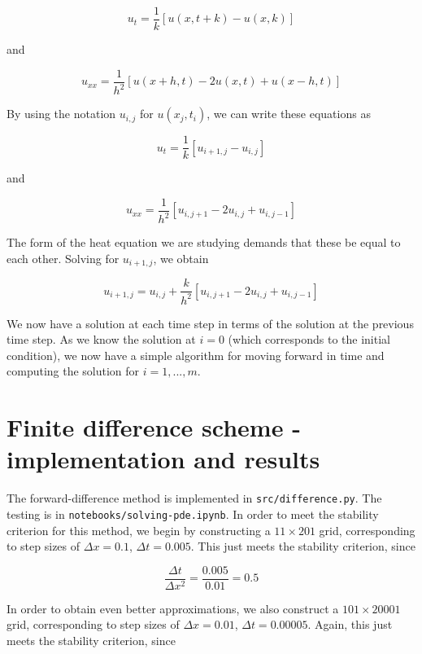 \documentclass{article}
\begin{document}
\begin{equation}
    u_t = \frac{1}{k}[u(x, t + k) - u(x, k)]
\end{equation}

and

\begin{equation}
    u_{xx} = \frac{1}{h^2}[u(x + h, t) - 2u(x, t) + u(x - h, t)]
\end{equation}

By using the notation $u_{i, j}$ for $u(x_j, t_i)$, we can write these equations as

\begin{equation}
    u_t = \frac{1}{k}[u_{i + 1, j} - u_{i, j}]
\end{equation}

and

\begin{equation}
    u_{xx} = \frac{1}{h^2}[u_{i, j+1} - 2u_{i, j} + u_{i, j-1}]
\end{equation}

The form of the heat equation we are studying demands that these be equal to each other. Solving for $u_{i+1, j}$, we obtain

\begin{equation}
    u_{i+1, j} = u_{i, j} + \frac{k}{h^2}[u_{i, j+1} - 2u_{i, j} + u_{i, j-1}]
\end{equation}

We now have a solution at each time step in terms of the solution at the previous time step. As we know the solution at $i=0$ (which corresponds to the initial condition), we now have a simple algorithm for moving forward in time and computing the solution for $i=1, ..., m$.


\section{Finite difference scheme - implementation and results}
The forward-difference method is implemented in \texttt{src/difference.py}. The testing is in \texttt{notebooks/solving-pde.ipynb}. In order to meet the stability criterion for this method, we begin by constructing a $11 \times 201$ grid, corresponding to step sizes of $\Delta x = 0.1$, $\Delta t = 0.005$. This just meets the stability criterion, since

\begin{equation}
    \frac{\Delta t}{\Delta x^2} = \frac{0.005}{0.01}=0.5
\end{equation}

In order to obtain even better approximations, we also construct a $101 \times 20001$ grid, corresponding to step sizes of $\Delta x = 0.01$, $\Delta t = 0.00005$. Again, this just meets the stability criterion, since
\end{document}
